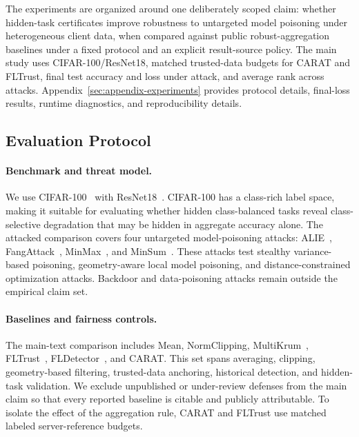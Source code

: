 \documentclass{article}
\begin{document}
The experiments are organized around one deliberately scoped claim: whether hidden-task certificates improve robustness to untargeted model poisoning under heterogeneous client data, when compared against public robust-aggregation baselines under a fixed protocol and an explicit result-source policy. The main study uses CIFAR-100/ResNet18, matched trusted-data budgets for CARAT and FLTrust, final test accuracy and loss under attack, and average rank across attacks. Appendix~\ref{sec:appendix-experiments} provides protocol details, final-loss results, runtime diagnostics, and reproducibility details.

\subsection{Evaluation Protocol}

\paragraph{Benchmark and threat model.}
We use CIFAR-100~\citep{krizhevsky2009learning} with ResNet18~\citep{he2016deep}. CIFAR-100 has a class-rich label space, making it suitable for evaluating whether hidden class-balanced tasks reveal class-selective degradation that may be hidden in aggregate accuracy alone. The attacked comparison covers four untargeted model-poisoning attacks: ALIE~\citep{baruch2019alie}, FangAttack~\citep{fang2020local}, MinMax~\citep{shejwalkar2021manipulating}, and MinSum~\citep{shejwalkar2021manipulating}. These attacks test stealthy variance-based poisoning, geometry-aware local model poisoning, and distance-constrained optimization attacks. Backdoor and data-poisoning attacks remain outside the empirical claim set.

\paragraph{Baselines and fairness controls.}
The main-text comparison includes Mean, NormClipping, MultiKrum~\citep{blanchard2017krum}, FLTrust~\citep{cao2021fltrust}, FLDetector~\citep{zhang2022fldetector}, and CARAT. This set spans averaging, clipping, geometry-based filtering, trusted-data anchoring, historical detection, and hidden-task validation. We exclude unpublished or under-review defenses from the main claim so that every reported baseline is citable and publicly attributable. To isolate the effect of the aggregation rule, CARAT and FLTrust use matched labeled server-reference budgets.
\end{document}
